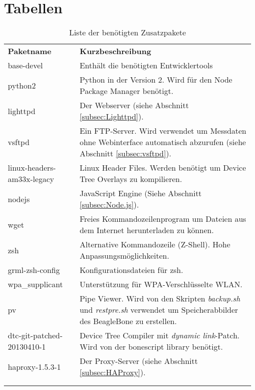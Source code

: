 \chapter{Tabellen}

\begin{longtabu} to \textwidth {
  X[1]
  X[4]}
  \textbf{Paketname} & \textbf{Kurzbeschreibung}\\
  base-devel & Enthält die benötigten Entwicklertools\\
  python2 & Python in der Version 2. Wird für den Node Package Manager benötigt.\\
  lighttpd  & Der Webserver (siehe Abschnitt \ref{subsec:Lighttpd}).\\
  vsftpd & Ein FTP-Server. Wird verwendet um Messdaten ohne Webinterface automatisch abzurufen (siehe Abschnitt \ref{subsec:vsftpd}).\\
  linux-headers-am33x-legacy & Linux Header Files. Werden benötigt um Device Tree Overlays zu kompilieren.\\
  nodejs & JavaScript Engine (Siehe Abschnitt \ref{subsec:Node.js}).\\
  wget & Freies Kommandozeilenprogram um Dateien aus dem Internet herunterladen zu können.\\
  zsh & Alternative Kommandozeile (Z-Shell). Hohe Anpassungsmöglichkeiten.\\
  grml-zsh-config & Konfigurationsdateien für zsh.\\
  wpa\_supplicant & Unterstützung für WPA-Verschlüsselte WLAN.\\
  pv & Pipe Viewer. Wird von den Skripten \textit{backup.sh} und \textit{restpre.sh} verwendet um Speicherabbilder des BeagleBone zu erstellen.\\
  dtc-git-patched-20130410-1 & Device Tree Compiler mit \textit{dynamic link}-Patch. Wird von der bonescript library benötigt.\\
  haproxy-1.5.3-1 & Der Proxy-Server (siehe Abschnitt \ref{subsec:HAProxy}).\\
  
  \caption{Liste der benötigten Zusatzpakete}\\
  \label{tab:additionalPackages}\\
\end{longtabu}
